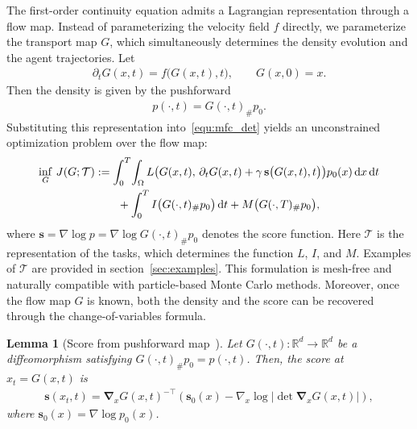 \documentclass[preprint]{elsarticle}
\newtheorem{lemma}[theorem]{Lemma}
\newcommand{\dd}{\,\mathrm{d}}          \newcommand{\pdv}[2]{\dfrac{\partial #1}{\partial #2}}
\newcommand{\R}{\mathbb{R}}
\newcommand{\g}{\gamma}
\newcommand{\Om}{\Omega}
\begin{document}
The first-order continuity equation admits a Lagrangian representation through a flow map. Instead of parameterizing the velocity field $f$ directly, we parameterize the transport map $G$, which simultaneously determines the density evolution and the agent trajectories. Let
\begin{align}\label{equ:pt_G}
    \partial_t G(x,t)=f\bigl(G(x,t),t\bigr),
    \qquad
    G(x,0)=x.
\end{align}
Then the density is given by the pushforward
\begin{align}
    p(\cdot,t)=G(\cdot,t)_\# p_0.
    \label{equ:flow_map}
\end{align}
Substituting this representation into~\eqref{equ:mfc_det} yields an unconstrained optimization problem over the flow map:
\begin{align}
    \inf_{G}\, J(G;\mathcal{T})
    &:= \int_0^T\!\int_\Om L\qb{G(x,t),\, \partial_t G(x,t) + \g\, \mathbf{s}\qb{G(x,t),t}} p_0(x)\dd x\dd t \notag\\
    &\qquad + \int_0^T I\qb{G(\cdot,t)_\# p_0}\dd t
    + M\qb{G(\cdot,T)_\# p_0},
    \label{equ:lagrangian_cost}
\end{align}
where $\mathbf{s}=\nabla\log p = \nabla \log G(\cdot,t)_\# p_0$ denotes the score function. Here $\mathcal{T}$ is the representation of the tasks, which determines the function $L$, $I$, and $M$. Examples of $\mathcal{T}$ are provided in section~\ref{sec:examples}. This formulation is mesh-free and naturally compatible with particle-based Monte Carlo methods. Moreover, once the flow map $G$ is known, both the density and the score can be recovered through the change-of-variables formula.

\begin{lemma}[Score from pushforward map~\cite{Kobyzev2021}]
\label{lem:score_pushforward}
Let $G(\cdot,t):\R^d\to\R^d$ be a diffeomorphism satisfying $G(\cdot,t)_\# p_0=p(\cdot,t)$. Then, the score at $x_t=G(x,t)$ is
\begin{align}
    \mathbf{s}(x_t,t) = \boldsymbol{\nabla}_x G(x,t)^{-\top}
    \left(\mathbf{s}_0(x)-\nabla_x\log\left|\det\boldsymbol{\nabla}_xG(x,t)\right|\right),
    \label{equ:score_compute_jacobian}
\end{align}
where $\mathbf{s}_0(x)=\nabla\log p_0(x)$.
\end{lemma}
\end{document}
